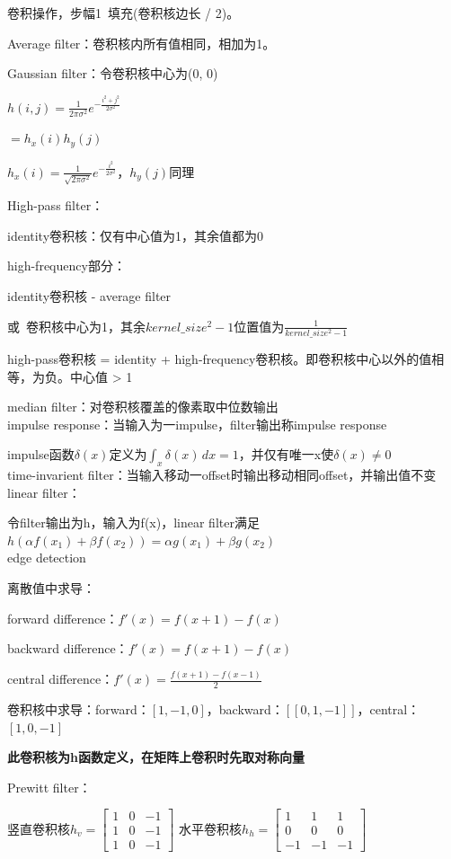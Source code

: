 \documentclass[UTF8]{ctexart}
\begin{document}
  卷积操作，步幅1\ 填充(卷积核边长 / 2)。
  
  Average filter：卷积核内所有值相同，相加为1。

  Gaussian filter：令卷积核中心为(0, 0)

  \quad $h(i, j) = \frac{1}{2\pi\sigma^2}e^{-\frac{i^2+j^2}{2\sigma^2}}$

  \quad \quad $ = h_x(i) h_y(j)$

  \quad \quad $h_x(i) = \frac{1}{\sqrt{2\pi\sigma^2}}e^{-\frac{i^2}{2\sigma^2}}$，$h_y(j)$同理
  
  High-pass filter：

  \quad identity卷积核：仅有中心值为1，其余值都为0

  \quad high-frequency部分：
  
  \quad \quad identity卷积核 - average filter

  \quad \quad 或\ 卷积核中心为1，其余$kernel\_size^2 - 1$位置值为$\frac{1}{kernel\_size^2 - 1}$

  \quad high-pass卷积核 = identity + high-frequency卷积核。即卷积核中心以外的值相等，为负。中心值 > 1

  median filter：对卷积核覆盖的像素取中位数输出\\
impulse response：当输入为一impulse，filter输出称impulse response 

  impulse函数$\delta(x)$定义为$\int_x \delta(x) \,dx = 1$，并仅有唯一x使$\delta(x) \neq 0$\\
time-invarient filter：当输入移动一offset时输出移动相同offset，并输出值不变\\
linear filter：

  令filter输出为h，输入为f(x)，linear filter满足$h(\alpha f(x_1) + \beta f(x_2)) = \alpha g(x_1) + \beta g(x_2)$\\
edge detection

  离散值中求导：
  
  \quad forward difference：$f'(x) = f(x + 1) - f(x)$

  \quad backward difference：$f'(x) = f(x + 1) - f(x)$
  
  \quad central difference：$f'(x) = \frac{f(x + 1) - f(x - 1)}{2}$

  卷积核中求导：forward：$[1, -1, 0]$，backward：$[[0, 1, -1]]$，central：$[1, 0, -1]$

  \quad \textbf{此卷积核为h函数定义，在矩阵上卷积时先取对称向量}

  Prewitt filter：

  \quad 竖直卷积核$h_v = \begin{bmatrix}
    1 & 0 & -1 \\
    1 & 0 & -1 \\
    1 & 0 & -1
    \end{bmatrix}$
    水平卷积核$h_h = \begin{bmatrix}
      1 & 1 & 1 \\
      0 & 0 & 0 \\
      -1 & -1 & -1
      \end{bmatrix}$
\end{document}
